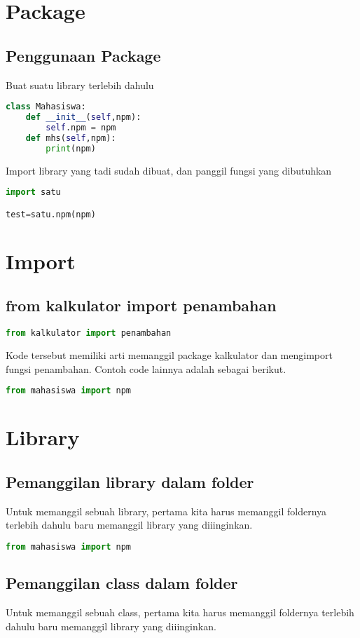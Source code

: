 \section{Package}
\subsection{Penggunaan Package}
Buat suatu library terlebih dahulu

\begin{lstlisting}[language=Python]
class Mahasiswa:
	def __init__(self,npm):
		self.npm = npm
	def mhs(self,npm):
		print(npm)
\end{lstlisting}

Import library yang tadi sudah dibuat, dan panggil fungsi yang dibutuhkan
\begin{lstlisting}[language=Python]
import satu

test=satu.npm(npm)
\end{lstlisting}

\section{Import}
\subsection{from kalkulator import penambahan}
\begin{lstlisting}[language=Python]
from kalkulator import penambahan
\end{lstlisting}

Kode tersebut memiliki arti memanggil package kalkulator dan mengimport fungsi penambahan. Contoh code lainnya adalah sebagai berikut.
\begin{lstlisting}[language=Python]
from mahasiswa import npm
\end{lstlisting}

\section{Library}
\subsection{Pemanggilan library dalam folder}
Untuk memanggil sebuah library, pertama kita harus memanggil foldernya terlebih dahulu baru memanggil library yang diiinginkan.
\begin{lstlisting}[language=Python]
from mahasiswa import npm
\end{lstlisting}

\subsection{Pemanggilan class dalam folder}
Untuk memanggil sebuah class, pertama kita harus memanggil foldernya terlebih dahulu baru memanggil library yang diiinginkan.
